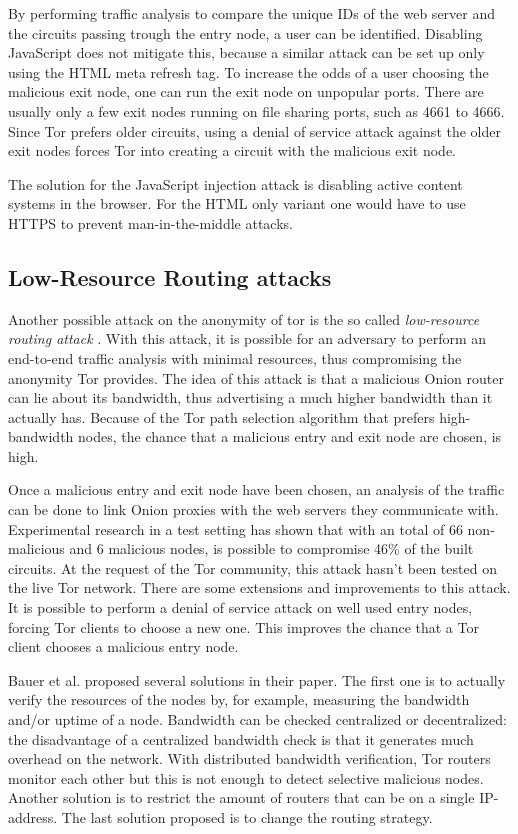 \documentclass{article}
\begin{document}
		By performing traffic analysis to compare the unique IDs of the web server and the circuits passing trough the entry node, a user can be identified. Disabling JavaScript does not mitigate this, because a similar attack can be set up only using the HTML meta refresh tag. To increase the odds of a user choosing the malicious exit node, one can run the exit node on unpopular ports. There are usually only a few exit nodes running on file sharing ports, such as 4661 to 4666. Since Tor prefers older circuits, using a denial of service attack against the older exit nodes forces Tor into creating a circuit with the malicious exit node.

		The solution for the JavaScript injection attack is disabling active content systems in the browser. For the HTML only variant one would have to use HTTPS to prevent man-in-the-middle attacks.
		
	\subsection{Low-Resource Routing attacks}
		Another possible attack on the anonymity of tor is the so called \emph{low-resource routing attack} \cite{bauer2007low}. With this attack, it is possible for an adversary to perform an end-to-end traffic analysis with minimal resources, thus compromising the anonymity Tor provides. The idea of this attack is that a malicious Onion router can lie about its bandwidth, thus advertising a much higher bandwidth than it actually has. Because of the Tor path selection algorithm that prefers high-bandwidth nodes, the chance that a malicious entry and exit node are chosen, is high.

		Once a malicious entry and exit node have been chosen, an analysis of the traffic can be done to link Onion proxies with the web servers they communicate with. Experimental research in a test setting has shown that with an total of 66 non-malicious and 6 malicious nodes, is possible to compromise 46\% of the built circuits. At the request of the Tor community, this attack hasn't been tested on the live Tor network. There are some extensions and improvements to this attack. It is possible to perform a denial of service attack on well used entry nodes, forcing Tor clients to choose a new one. This improves the chance that a Tor client chooses a malicious entry node. 

		Bauer et al. proposed several solutions in their paper. The first one is to actually verify the resources of the nodes by, for example, measuring the bandwidth and/or uptime of a node. Bandwidth can be checked centralized or decentralized: the disadvantage of a centralized bandwidth check is that it generates much overhead on the network. With distributed bandwidth verification, Tor routers monitor each other but this is not enough to detect selective malicious nodes. Another solution is to restrict the amount of routers that can be on a single IP-address. The last solution proposed is to change the routing strategy.	
		
\end{document}
